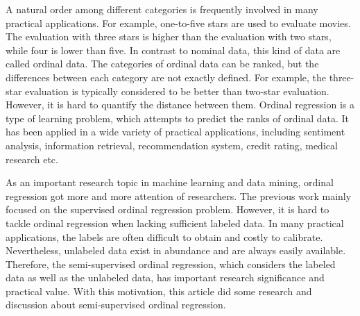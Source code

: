 \begin{enabstract}

A natural order among different categories is frequently involved in many practical applications. For example, one-to-five stars are used to evaluate movies. The evaluation with three stars is higher than the evaluation with two stars, while four is lower than five. In contrast to nominal data, this kind of data are called ordinal data. The categories of ordinal data can be ranked, but the differences between each category are not exactly defined. For example, the three-star evaluation is typically considered to be better than two-star evaluation. However, it is hard to quantify the distance between them. Ordinal regression is a type of learning problem, which attempts to predict the ranks of ordinal data. It has been applied in a wide variety of practical applications, including sentiment analysis, information retrieval, recommendation system, credit rating, medical research etc.

As an important research topic in machine learning and data mining, ordinal regression got more and more attention of researchers. The previous work mainly focused on the supervised ordinal regression problem. However, it is hard to tackle ordinal regression when lacking sufficient labeled data. In many practical applications, the labels are often difficult to obtain and costly to calibrate. Nevertheless, unlabeled data exist in abundance and are always easily available. Therefore, the semi-supervised ordinal regression, which considers the labeled data as well as the unlabeled data, has important research significance and practical value. With this motivation, this article did some research and discussion about semi-supervised ordinal regression.


\end{enabstract}
